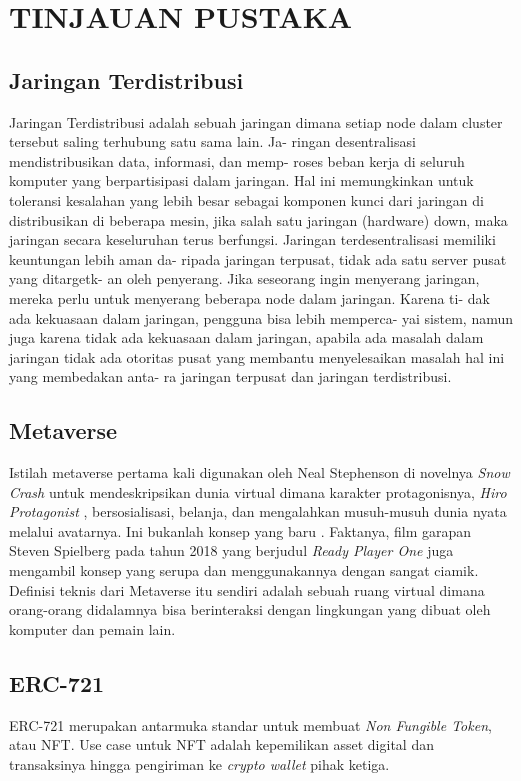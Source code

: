 \section{TINJAUAN PUSTAKA}


\subsection{Jaringan Terdistribusi}

Jaringan Terdistribusi adalah sebuah jaringan dimana setiap
node dalam cluster tersebut saling terhubung satu sama lain. Ja-
ringan desentralisasi mendistribusikan data, informasi, dan memp-
roses beban kerja di seluruh komputer yang berpartisipasi dalam
jaringan. Hal ini memungkinkan untuk toleransi kesalahan yang
lebih besar sebagai komponen kunci dari jaringan di distribusikan
di beberapa mesin, jika salah satu jaringan (hardware) down, maka
jaringan secara keseluruhan terus berfungsi.
Jaringan terdesentralisasi memiliki keuntungan lebih aman da-
ripada jaringan terpusat, tidak ada satu server pusat yang ditargetk-
an oleh penyerang. Jika seseorang ingin menyerang jaringan, mereka
perlu untuk menyerang beberapa node dalam jaringan. Karena ti-
dak ada kekuasaan dalam jaringan, pengguna bisa lebih memperca-
yai sistem, namun juga karena tidak ada kekuasaan dalam jaringan,
apabila ada masalah dalam jaringan tidak ada otoritas pusat yang
membantu menyelesaikan masalah hal ini yang membedakan anta-
ra jaringan terpusat dan jaringan terdistribusi.

\subsection{Metaverse}

Istilah metaverse pertama kali digunakan oleh Neal Stephenson di novelnya \emph{Snow Crash} untuk
mendeskripsikan dunia virtual dimana karakter protagonisnya, \emph{Hiro Protagonist}
, bersosialisasi, belanja, dan mengalahkan musuh-musuh dunia nyata melalui avatarnya. Ini bukanlah konsep yang baru
. Faktanya, film garapan Steven Spielberg pada tahun 2018 yang berjudul \emph{Ready Player One} juga mengambil konsep yang serupa dan
menggunakannya dengan sangat ciamik. Definisi teknis dari Metaverse itu sendiri adalah sebuah ruang virtual dimana orang-orang didalamnya bisa berinteraksi 
dengan lingkungan yang dibuat oleh komputer dan pemain lain.

\subsection{ERC-721}
ERC-721 merupakan antarmuka standar untuk membuat \emph{Non Fungible Token}, atau NFT.
Use case untuk NFT adalah kepemilikan asset digital dan transaksinya hingga pengiriman ke 
\emph{crypto wallet} pihak ketiga.


